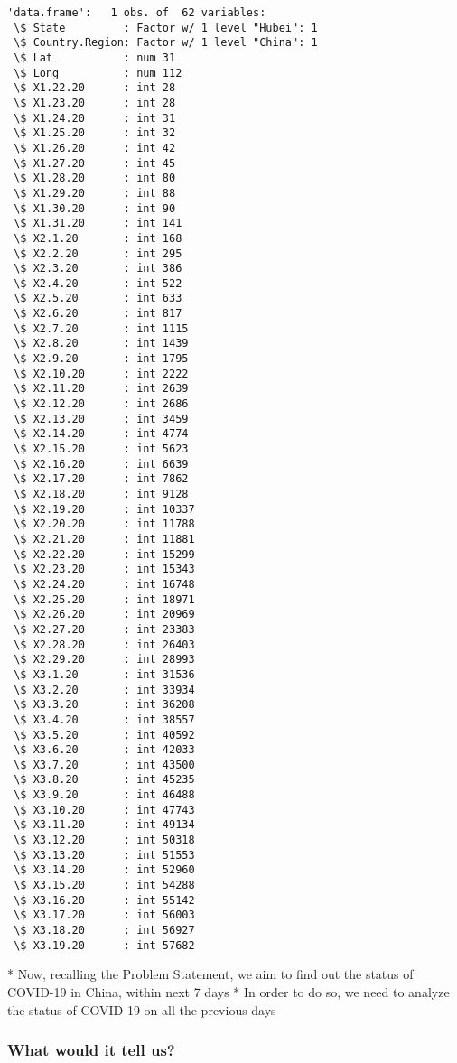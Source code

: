 \documentclass[11pt]{article}
\begin{document}
    \begin{Verbatim}[commandchars=\\\{\}]
'data.frame':   1 obs. of  62 variables:
 \$ State         : Factor w/ 1 level "Hubei": 1
 \$ Country.Region: Factor w/ 1 level "China": 1
 \$ Lat           : num 31
 \$ Long          : num 112
 \$ X1.22.20      : int 28
 \$ X1.23.20      : int 28
 \$ X1.24.20      : int 31
 \$ X1.25.20      : int 32
 \$ X1.26.20      : int 42
 \$ X1.27.20      : int 45
 \$ X1.28.20      : int 80
 \$ X1.29.20      : int 88
 \$ X1.30.20      : int 90
 \$ X1.31.20      : int 141
 \$ X2.1.20       : int 168
 \$ X2.2.20       : int 295
 \$ X2.3.20       : int 386
 \$ X2.4.20       : int 522
 \$ X2.5.20       : int 633
 \$ X2.6.20       : int 817
 \$ X2.7.20       : int 1115
 \$ X2.8.20       : int 1439
 \$ X2.9.20       : int 1795
 \$ X2.10.20      : int 2222
 \$ X2.11.20      : int 2639
 \$ X2.12.20      : int 2686
 \$ X2.13.20      : int 3459
 \$ X2.14.20      : int 4774
 \$ X2.15.20      : int 5623
 \$ X2.16.20      : int 6639
 \$ X2.17.20      : int 7862
 \$ X2.18.20      : int 9128
 \$ X2.19.20      : int 10337
 \$ X2.20.20      : int 11788
 \$ X2.21.20      : int 11881
 \$ X2.22.20      : int 15299
 \$ X2.23.20      : int 15343
 \$ X2.24.20      : int 16748
 \$ X2.25.20      : int 18971
 \$ X2.26.20      : int 20969
 \$ X2.27.20      : int 23383
 \$ X2.28.20      : int 26403
 \$ X2.29.20      : int 28993
 \$ X3.1.20       : int 31536
 \$ X3.2.20       : int 33934
 \$ X3.3.20       : int 36208
 \$ X3.4.20       : int 38557
 \$ X3.5.20       : int 40592
 \$ X3.6.20       : int 42033
 \$ X3.7.20       : int 43500
 \$ X3.8.20       : int 45235
 \$ X3.9.20       : int 46488
 \$ X3.10.20      : int 47743
 \$ X3.11.20      : int 49134
 \$ X3.12.20      : int 50318
 \$ X3.13.20      : int 51553
 \$ X3.14.20      : int 52960
 \$ X3.15.20      : int 54288
 \$ X3.16.20      : int 55142
 \$ X3.17.20      : int 56003
 \$ X3.18.20      : int 56927
 \$ X3.19.20      : int 57682
    \end{Verbatim}

     * Now, recalling the Problem Statement, we aim to find out the status
of COVID-19 in China, within next 7 days * In order to do so, we need to
analyze the status of COVID-19 on all the previous days

\hypertarget{what-would-it-tell-us}{%
\subsubsection{What would it tell us?}\label{what-would-it-tell-us}}
\end{document}
